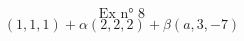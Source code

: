 \documentclass{article}
\begin{document}
\[ \text{Ex n° 8} \]
\[ (1,1,1) + \alpha (2,2,2) + \beta (a,3,-7) \]
\end{document}
